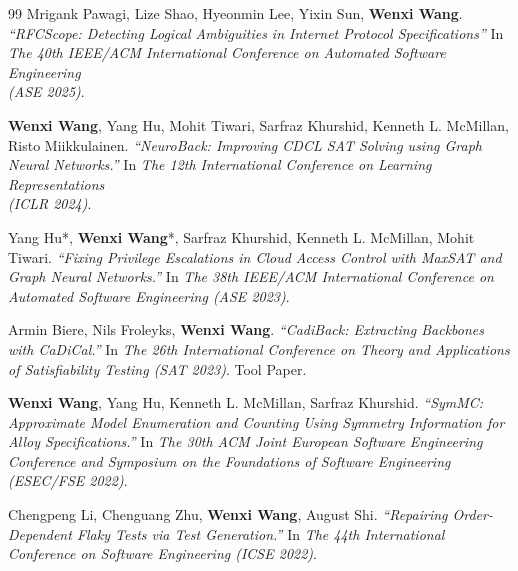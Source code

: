 \begin{thebibliography}{99}
{{ Mrigank Pawagi, Lize Shao, Hyeonmin Lee, Yixin Sun, \textbf{Wenxi Wang}.
		\emph{``RFCScope: Detecting Logical Ambiguities in Internet Protocol Specifications''}
		In \textit{The 40th IEEE/ACM International Conference on Automated Software Engineering\\(ASE 2025)}. \href{https://wenxiwang.github.io/papers/rfcscope/rfcscope_paper.pdf}{\color{color1}{\textbf{[PDF]}}}}}

	\textbf{Wenxi Wang}, Yang Hu, Mohit Tiwari, Sarfraz Khurshid, Kenneth L. McMillan, Risto Miikkulainen.
	\emph{``NeuroBack: Improving CDCL SAT Solving using Graph Neural Networks.''}
	In \textit{The 12th International Conference on Learning Representations\\(ICLR 2024)}. \href{https://arxiv.org/pdf/2110.14053.pdf}{\color{color1}{\textbf{[PDF]}}}
	
	
	Yang Hu*, \textbf{Wenxi Wang}*, Sarfraz Khurshid, Kenneth L. McMillan, Mohit Tiwari.
	\emph{``Fixing Privilege Escalations in Cloud Access Control with MaxSAT and Graph Neural Networks.''}
	In \textit{The 38th IEEE/ACM International Conference on Automated Software Engineering (ASE 2023)}. \href{https://wenxiwang.github.io/papers/IAMPERE_ase2023.pdf}{\color{color1}{\textbf{[PDF]}}}
	
	Armin Biere, Nils Froleyks, \textbf{Wenxi Wang}.
	\emph{``CadiBack: Extracting Backbones with CaDiCal.''}
	In \textit{The 26th International Conference on Theory and Applications of Satisfiability Testing (SAT 2023)}.
	Tool Paper. \href{https://wenxiwang.github.io/papers/cadiback.pdf}{\color{color1}{\textbf{[PDF]}}}
	
	\textbf{Wenxi Wang}, Yang Hu, Kenneth L. McMillan, Sarfraz Khurshid.
	\emph{``SymMC: Approximate Model Enumeration and Counting Using Symmetry Information for Alloy Specifications.''}
	In \textit{The 30th ACM Joint European Software Engineering Conference and Symposium on the Foundations of Software Engineering (ESEC/FSE 2022)}. \href{https://wenxiwang.github.io/papers/SymMC.pdf}{\color{color1}{\textbf{[PDF]}}}
	
	Chengpeng Li, Chenguang Zhu, \textbf{Wenxi Wang}, August Shi.
	\emph{``Repairing Order-Dependent Flaky Tests via Test Generation.''}
	In \textit{The 44th International Conference on Software Engineering (ICSE 2022)}. \href{https://wenxiwang.github.io/papers/ICSE2022.pdf}{\color{color1}{\textbf{[PDF]}}}
	

\end{thebibliography}
